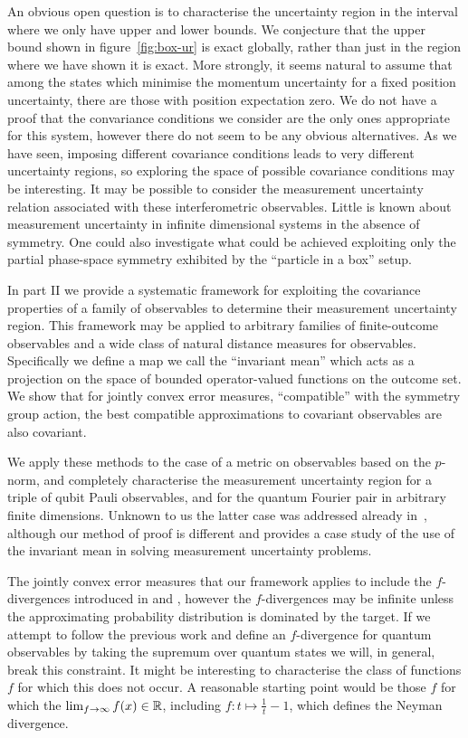 An obvious open question is to characterise the uncertainty region in the interval where we only have upper and lower bounds. We conjecture that the upper bound shown in figure~\ref{fig:box-ur} is exact globally, rather than just in the region where we have shown it is exact. More strongly, it seems natural to assume that among the states which minimise the momentum uncertainty for a fixed position uncertainty, there are those with position expectation zero. We do not have a proof that the convariance conditions we consider are the only ones appropriate for this system, however there do not seem to be any obvious alternatives. As we have seen, imposing different covariance conditions leads to very different uncertainty regions, so exploring the space of possible covariance conditions may be interesting. It may be possible to consider the measurement uncertainty relation associated with these interferometric observables. Little is known about measurement uncertainty in infinite dimensional systems in the absence of symmetry. One could also investigate what could be achieved exploiting only the partial phase-space symmetry exhibited by the ``particle in a box'' setup.


In part II we provide a systematic framework for exploiting the covariance properties of a family of observables to determine their measurement uncertainty region. This framework may be applied to arbitrary families of finite-outcome observables and a wide class of natural distance measures for observables. Specifically we define a map we call the ``invariant mean'' which acts as a projection on the space of bounded operator-valued functions on the outcome set. We show that for jointly convex error measures, ``compatible'' with the symmetry group action, the best compatible approximations to covariant observables are also covariant.

We apply these methods to the case of a metric on observables based on the $p$-norm, and completely characterise the measurement uncertainty region for a triple of qubit Pauli observables, and for the quantum Fourier pair in arbitrary finite dimensions. Unknown to us the latter case was addressed already in~\cite{Werner2016}, although our method of proof is different and provides a case study of the use of the invariant mean in solving measurement uncertainty problems.

The jointly convex error measures that our framework applies to include the $f$-divergences introduced in \cite{10.2307/2984279} and \cite{der1964informationstheoretische}, however the $f$-divergences may be infinite unless the approximating probability distribution is dominated by the target. If we attempt to follow the previous work and define an $f$-divergence for quantum observables by taking the supremum over quantum states we will, in general, break this constraint. It might be interesting to characterise the class of functions $f$ for which this does not occur. A reasonable starting point would be those $f$ for which the $\lim_{f\to\infty}f(x) \in \mathbb{R}$, including $f:t\mapsto \frac{1}{t}-1$, which defines the Neyman divergence.


